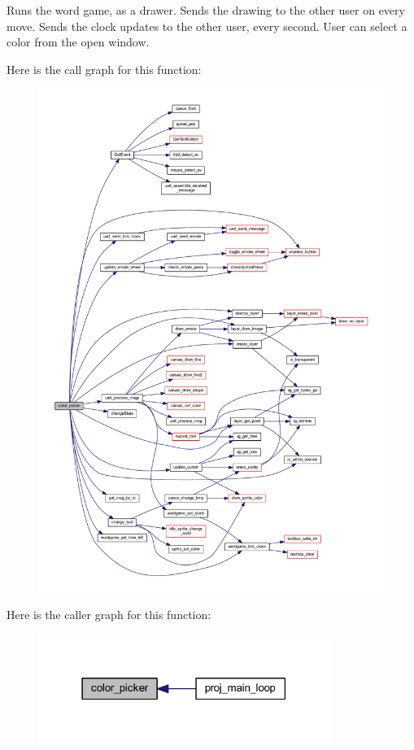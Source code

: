 Runs the word game, as a drawer. Sends the drawing to the other user on every move. Sends the clock updates to the other user, every second. User can select a color from the open window. 

Here is the call graph for this function\+:\nopagebreak
\begin{figure}[H]
\begin{center}
\leavevmode
\includegraphics[width=350pt]{group__pengoo_ga178ee685108a5f6164bf1c1757040ee2_cgraph}
\end{center}
\end{figure}
Here is the caller graph for this function\+:\nopagebreak
\begin{figure}[H]
\begin{center}
\leavevmode
\includegraphics[width=267pt]{group__pengoo_ga178ee685108a5f6164bf1c1757040ee2_icgraph}
\end{center}
\end{figure}
\mbox{\label{group__pengoo_ga0c383f0cb382ef07b72894184255e49f}} 
